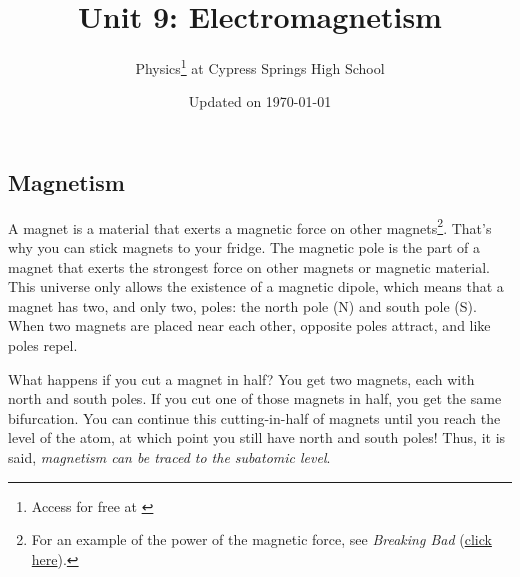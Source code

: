 \documentclass{article}
\title{Unit 9: Electromagnetism}
\author{Physics\footnote{Access for free at \href{\openstax}{\openstax}} \hspace{0.1ex} at Cypress Springs High School}
\date{Updated on \today}
\numberwithin{equation}{section}
\numberwithin{figure}{section}
\begin{document}
\maketitle

\subsection{Magnetism} \label{24h7hD}

A magnet is a material that exerts a magnetic force on other magnets\footnote{For an example of the power of the magnetic force, see \textit{Breaking Bad} (\href{https://youtu.be/gzCXowhks80?t=4}{click here}).}. That's why you can stick magnets to your fridge. The \gls{magnetic pole} is the part of a magnet that exerts the strongest force on other magnets or magnetic material. This universe only allows the existence of a \gls{magnetic dipole}, which means that a magnet has two, and only two, poles: the \gls{north pole} (N) and \gls{south pole} (S). When two magnets are placed near each other, opposite poles attract, and like poles repel.

\begin{center}
    \captionsetup{type=figure,margin=1in}
\end{center}


What happens if you cut a magnet in half? You get two magnets, each with north and south poles. If you cut one of those magnets in half, you get the same bifurcation. You can continue this cutting-in-half of magnets until you reach the level of the atom, at which point you still have north and south poles! Thus, it is said, \textit{magnetism can be traced to the subatomic level}.
\end{document}
